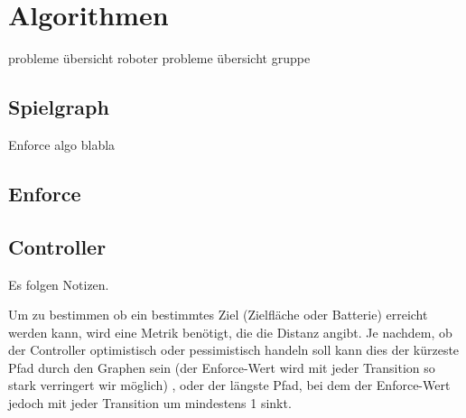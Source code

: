 \section{Algorithmen}
probleme übersicht roboter
probleme übersicht gruppe
\subsection{Spielgraph}
Enforce algo blabla
\subsection{Enforce}
\subsection{Controller}
Es folgen Notizen.

Um zu bestimmen ob ein bestimmtes Ziel (Zielfläche oder Batterie) erreicht werden kann, wird eine Metrik benötigt,
die die Distanz angibt. Je nachdem, ob der Controller optimistisch oder pessimistisch handeln soll kann dies der kürzeste
Pfad durch den Graphen sein (der Enforce-Wert wird mit jeder Transition so stark verringert wir möglich)
, oder der längste Pfad, bei dem der Enforce-Wert jedoch mit jeder Transition um mindestens 1 sinkt.